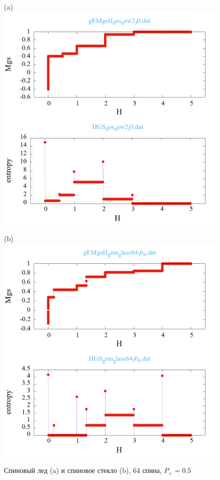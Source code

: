 \documentclass[utf8, babel, sor, jor, amsmath, amssymb, reprint]{elsarticle} %
\begin{document}
\begin{figure}[H]
	\begin{minipage}[h]{0.5\linewidth}
		\centering(a)
		\includegraphics[width=1\linewidth]{pictures/_multiplot_SI64_J0}
	\end{minipage}
	\hfill
	\begin{minipage}[h]{0.5\linewidth}
		\centering(b)
		\includegraphics[width=1\linewidth]{pictures/_multiplot_SG64_J0}
	\end{minipage}
	\caption{Спиновый лед (a) и спиновое стекло (b), 64 спина, $P_+ = 0.5$}
	\label{fig:_multiplot_SI_SG_64}
\end{figure}
\end{document}
